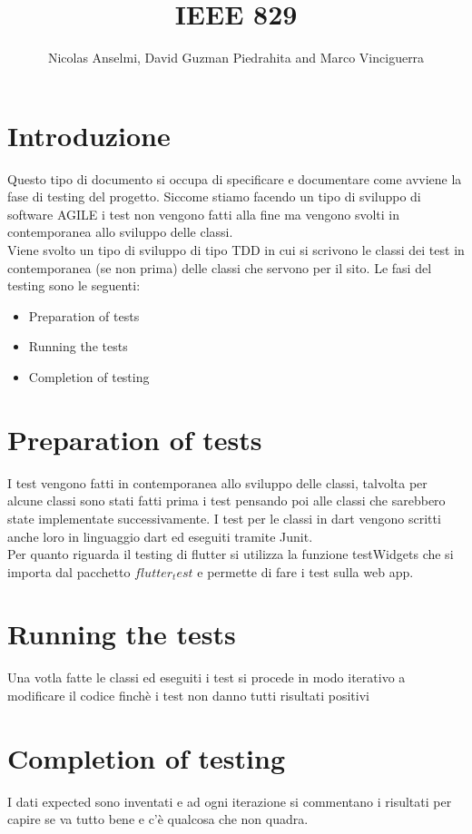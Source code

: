 \documentclass{article}
\title{IEEE 829}
\author{Nicolas Anselmi, David Guzman Piedrahita and Marco Vinciguerra}
\begin{document}
\maketitle
\section{Introduzione}
Questo tipo di documento si occupa di specificare e documentare come avviene la fase di testing
del progetto. Siccome stiamo facendo un tipo di sviluppo di software AGILE i test non vengono
fatti alla fine ma vengono svolti in contemporanea allo sviluppo delle classi.
\\Viene svolto un tipo di sviluppo di tipo TDD in cui si scrivono le classi dei test in 
contemporanea (se non prima) delle classi che servono per il sito. Le fasi del testing sono le 
seguenti:
\begin{itemize}
    \item Preparation of tests 
    \item Running the  tests
    \item Completion of testing
\end{itemize}

\section{Preparation of tests}
I test vengono fatti in contemporanea allo sviluppo delle classi, talvolta per alcune classi
sono stati fatti prima i test pensando poi alle classi che sarebbero state implementate successivamente.
I test per le classi in dart vengono scritti anche loro in linguaggio dart ed eseguiti tramite Junit.
\\Per quanto riguarda il testing di flutter si utilizza la funzione testWidgets che si importa 
dal pacchetto $flutter_test$ e permette di fare i test sulla web app.

\section{Running the tests}
Una votla fatte le classi ed eseguiti i test si procede in modo iterativo a modificare il codice
finchè i test non danno tutti risultati positivi

\section{Completion of testing}
I dati expected sono inventati e ad ogni iterazione si commentano i risultati per capire 
se va tutto bene e c'è qualcosa che non  quadra.
\end{document}

